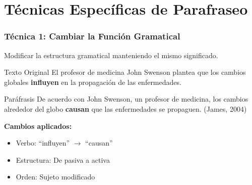 \documentclass[aspectratio=169]{beamer}
\begin{document}

\section{Técnicas Específicas de Parafraseo}

\begin{frame}
	\frametitle{Técnica 1: Cambiar la Función Gramatical}
	
	Modificar la estructura gramatical manteniendo el mismo significado.
	
	\vspace{1em}
	
	\begin{exampleblock}{Texto Original}
		\small
		El profesor de medicina John Swenson plantea que los cambios globales \textbf{influyen} en la propagación de las enfermedades.
	\end{exampleblock}
	
	\vspace{0.5em}
	
	\begin{exampleblock}{Paráfrasis}
		\small
		De acuerdo con John Swenson, un profesor de medicina, los cambios alrededor del globo \textbf{causan} que las enfermedades se propaguen. (James, 2004)
	\end{exampleblock}
	
	\vspace{0.5em}
	
	\textbf{Cambios aplicados:}
	\begin{itemize}
		\item Verbo: ``influyen'' $\rightarrow$ ``causan''
		\item Estructura: De pasiva a activa
		\item Orden: Sujeto modificado
	\end{itemize}
\end{frame}
\end{document}
